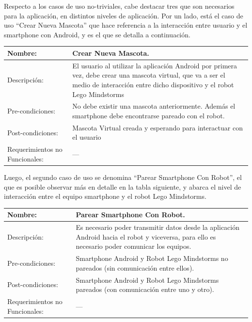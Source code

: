 \documentclass[letterpaper,12pt]{article} %
\numberwithin{equation}{section} %
\numberwithin{figure}{section} %
\numberwithin{table}{section} %
\begin{document}
Respecto a los casos de uso no-triviales, cabe destacar tres que son necesarios para la aplicaci\'on, en distintos niveles de aplicaci\'on. Por un lado, est\'a el caso de uso ``Crear Nueva Mascota'' que hace referencia a la interacci\'on entre usuario y el smartphone con Android, y es el que se detalla a continuaci\'on.\\

\begin{table}[H]
  \centering
  \begin{tabular}{p{5cm}p{9cm}}\hline\hline
    Nombre: & Crear Nueva Mascota. \\ \hline
    Descripci\'on: & El usuario al utilizar la aplicaci\'on Android por primera vez, debe crear una mascota virtual, que va a ser el medio de interacci\'on entre dicho dispositivo y el robot Lego Mindstorms\\ \hline %
    Pre-condiciones: & No debe existir una mascota anteriormente. Adem\'as el smartphone debe encontrarse pareado con el robot.\\ \hline
    Post-condiciones: & Mascota Virtual creada y esperando para interactuar con el usuario\\ \hline
    Requerimientos no Funcionales: & ---\\ \hline\hline %
  \end{tabular}
  \label{tab:Crear}
\end{table}

Luego, el segundo caso de uso se denomina ``Parear Smartphone Con Robot'', el que es posible observar m\'as en detalle en la tabla siguiente, y abarca el nivel de interacci\'on entre el equipo smartphone y el robot Lego Mindstorms.\\

\begin{table}[H]
  \centering
  \begin{tabular}{p{5cm}p{9cm}}\hline\hline
    Nombre: & Parear Smartphone Con Robot. \\ \hline
    Descripci\'on: & Es necesario poder transmitir datos desde la aplicaci\'on Android hacia el robot y viceversa, para ello es necesario poder comunicar los equipos.\\ \hline %
    Pre-condiciones: & Smartphone Android y Robot Lego Mindstorms no pareados (sin comunicaci\'on entre ellos).\\ \hline
    Post-condiciones: & Smartphone Android y Robot Lego Mindstorms pareados (con comunicaci\'on entre uno y otro).\\ \hline
    Requerimientos no Funcionales: & ---\\ \hline\hline %
  \end{tabular}
  \label{tab:Parear}
\end{table}
\end{document}
